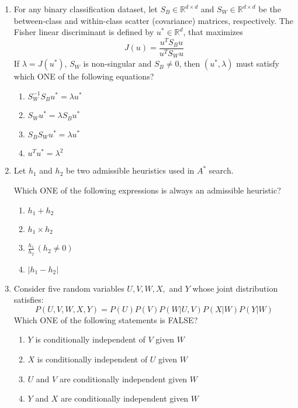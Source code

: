 \documentclass[journal,12pt,onecolumn]{IEEEtran}
\theoremstyle{remark}
\begin{document}
\begin{enumerate}
\item For any binary classification dataset, let $S_B \in \mathbb{R}^{d \times d}$ and $S_W \in \mathbb{R}^{d \times d}$ be the between-class and within-class scatter (covariance) matrices, respectively. The Fisher linear discriminant is defined by $u^* \in \mathbb{R}^d$, that maximizes
\[
J(u) = \frac{u^T S_B u}{u^T S_W u}
\]
If $\lambda = J(u^*)$, $S_W$ is non-singular and $S_B \neq 0$, then $(u^*, \lambda)$ must satisfy which ONE of the following equations?

\begin{enumerate}
    \item $S_W^{-1} S_B u^* = \lambda u^*$
    \item $S_W u^* = \lambda S_B u^*$
    \item $S_B S_W u^* = \lambda u^*$
    \item $u^T u^* = \lambda^2$
\end{enumerate}

    \item Let $h_1$ and $h_2$ be two admissible heuristics used in $A^*$ search.
    
    Which ONE of the following expressions is always an admissible heuristic?
    
    \begin{enumerate}
        \item $h_1 + h_2$
        \item $h_1 \times h_2$
        \item $\frac{h_1}{h_2} \, (h_2 \neq 0)$
        \item $|h_1 - h_2|$
    \end{enumerate}

    \item Consider five random variables $U, V, W, X,$ and $Y$ whose joint distribution satisfies:
    \[
    P(U, V, W, X, Y) = P(U) P(V) P(W | U, V) P(X | W) P(Y | W)
    \]
    Which ONE of the following statements is FALSE?
    
    \begin{enumerate}
        \item $Y$ is conditionally independent of $V$ given $W$
        \item $X$ is conditionally independent of $U$ given $W$
        \item $U$ and $V$ are conditionally independent given $W$
        \item $Y$ and $X$ are conditionally independent given $W$
    \end{enumerate}


\end{enumerate}
\end{document}
